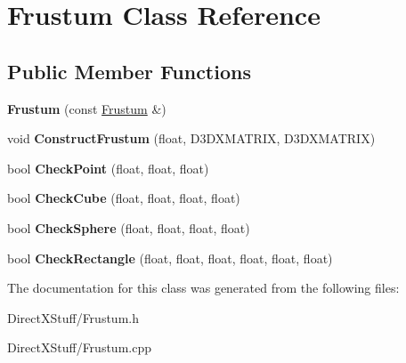 \hypertarget{class_frustum}{\section{Frustum Class Reference}
\label{class_frustum}
}
\subsection*{Public Member Functions}
\begin{DoxyCompactItemize}
\item 
\hypertarget{class_frustum_a724191e2e73e7f46c616bada0c77e8c7}{{\bfseries Frustum} (const \hyperlink{class_frustum}{Frustum} \&)}\label{class_frustum_a724191e2e73e7f46c616bada0c77e8c7}

\item 
\hypertarget{class_frustum_a300cd3f454a751a56041f244674b77ff}{void {\bfseries Construct\-Frustum} (float, D3\-D\-X\-M\-A\-T\-R\-I\-X, D3\-D\-X\-M\-A\-T\-R\-I\-X)}\label{class_frustum_a300cd3f454a751a56041f244674b77ff}

\item 
\hypertarget{class_frustum_aab45b8de6e6660832f9687f9c7966722}{bool {\bfseries Check\-Point} (float, float, float)}\label{class_frustum_aab45b8de6e6660832f9687f9c7966722}

\item 
\hypertarget{class_frustum_a925fe0d30a77e450e3af46ba7ebe841d}{bool {\bfseries Check\-Cube} (float, float, float, float)}\label{class_frustum_a925fe0d30a77e450e3af46ba7ebe841d}

\item 
\hypertarget{class_frustum_ae6d489f19e9e0b99a02201ddb057e3e3}{bool {\bfseries Check\-Sphere} (float, float, float, float)}\label{class_frustum_ae6d489f19e9e0b99a02201ddb057e3e3}

\item 
\hypertarget{class_frustum_a1367c6ae1cd082bdda9fad53d23265d6}{bool {\bfseries Check\-Rectangle} (float, float, float, float, float, float)}\label{class_frustum_a1367c6ae1cd082bdda9fad53d23265d6}

\end{DoxyCompactItemize}


The documentation for this class was generated from the following files\-:\begin{DoxyCompactItemize}
\item 
Direct\-X\-Stuff/Frustum.\-h\item 
Direct\-X\-Stuff/Frustum.\-cpp\end{DoxyCompactItemize}
